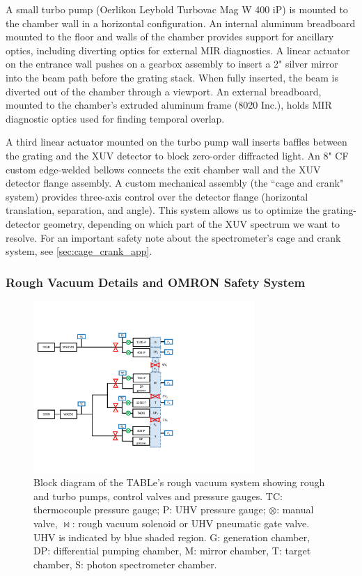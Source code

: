 A small turbo pump (Oerlikon Leybold Turbovac Mag W 400 iP) is mounted to the chamber wall in a horizontal configuration. An internal aluminum breadboard mounted to the floor and walls of the chamber provides support for ancillary optics, including diverting optics for external MIR diagnostics. A linear actuator on the entrance wall pushes on a gearbox assembly to insert a 2" silver mirror into the beam path before the grating stack. When fully inserted, the beam is diverted out of the chamber through a viewport. An external breadboard, mounted to the chamber's extruded aluminum frame (8020 Inc.), holds MIR diagnostic optics used for finding temporal overlap.

A third linear actuator mounted on the turbo pump wall inserts baffles between the grating and the XUV detector to block zero-order diffracted light. An 8" CF custom edge-welded bellows connects the exit chamber wall and the XUV detector flange assembly. A custom mechanical assembly (the ``cage and crank" system) provides three-axis control over the detector flange (horizontal translation, separation, and angle). This system allows us to optimize the grating-detector geometry, depending on which part of the XUV spectrum we want to resolve. For an important safety note about the spectrometer's cage and crank system, see \cref{sec:cage_crank_app}.

\subsubsection{Rough Vacuum Details and OMRON Safety System}
\label{sec:rough_vacuum_details}

\begin{figure}
	\centering
	\includegraphics[width=0.75\textwidth]{figures/chap2/rough_vacuum_schematic.pdf}
	\caption{Block diagram of the TABLe's rough vacuum system showing rough and turbo pumps, control valves and pressure gauges. TC: thermocouple pressure gauge; P: UHV pressure gauge; $\otimes$: manual valve, $\bowtie$: rough vacuum solenoid or UHV pneumatic gate valve. UHV is indicated by blue shaded region. G: generation chamber, DP: differential pumping chamber, M: mirror chamber, T: target chamber, S: photon spectrometer chamber.}
	\label{fig:rough_vacuum_schematic}
\end{figure}

